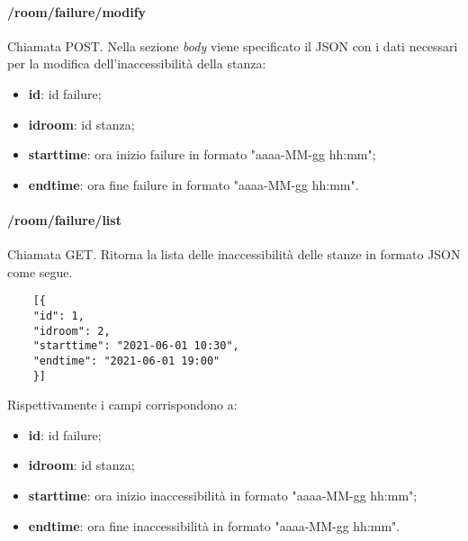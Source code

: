 \paragraph{/room/failure/modify}
Chiamata POST. Nella sezione \textit{body} viene specificato il JSON con i dati necessari per la modifica dell'inaccessibilità della stanza:
\begin{itemize}
	\item \textbf{id}: id failure;
	\item \textbf{idroom}: id stanza;
	\item \textbf{starttime}: ora inizio failure in formato "aaaa-MM-gg hh:mm";
	\item \textbf{endtime}: ora fine failure in formato "aaaa-MM-gg hh:mm".
\end{itemize}
\paragraph{/room/failure/list}
Chiamata GET. Ritorna la lista delle inaccessibilità delle stanze in formato JSON come segue.	\\
\begin{center}
	\begin{lstlisting}
	[{
	"id": 1,
	"idroom": 2,
	"starttime": "2021-06-01 10:30",
	"endtime": "2021-06-01 19:00"
	}]
	\end{lstlisting}
\end{center}
Rispettivamente i campi corrispondono a:
\begin{itemize}
	\item \textbf{id}: id failure;
	\item \textbf{idroom}: id stanza;
	\item \textbf{starttime}: ora inizio inaccessibilità in formato "aaaa-MM-gg hh:mm";
	\item \textbf{endtime}: ora fine inaccessibilità in formato "aaaa-MM-gg hh:mm".
\end{itemize}

